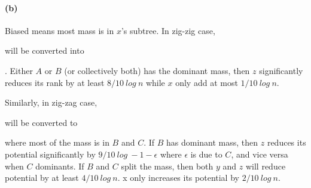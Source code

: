 \documentclass[10pt,letter]{article}
\begin{document}
\paragraph{(b)} Biased means most mass is in $x$'s subtree. In zig-zig case,  will be converted into . Either $A$ or $B$ (or collectively both) has the dominant mass, then $z$ significantly reduces its rank by at least $8/10 \: log \: n$ while $x$ only add at most $1/10\: log\:n$.

Similarly, in zig-zag case,  will be converted to  where most of the mass is in $B$ and $C$. If $B$ has dominant mass, then $z$ reduces its potential significantly by $9/10 \: log\: - 1 - \epsilon$ where $\epsilon$ is due to $C$, and vice versa when $C$ dominants. If $B$ and $C$ split the mass, then both $y$ and $z$ will reduce potential by at least $4/10 \: log\: n$. x only increases its potential by $2/10 \: log\: n$. 

\pagebreak
\end{document}

